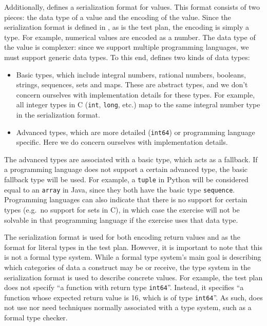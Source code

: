 \documentclass[5p,number]{elsarticle}
\begin{document}
    Additionally, \tested{} defines a serialization format for values.
    This format consists of two pieces: the data type of a value and the encoding of the value.
    Since the serialization format is defined in , as is the test plan, the encoding is simply a  type.
    For example, numerical values are encoded as a  number.
    The data type of the value is complexer: since we support multiple programming languages, we must support generic data types.
    To this end, \tested{} defines two kinds of data types:

    \begin{itemize}
        \item Basic types, which include integral numbers, rational numbers, booleans, strings, sequences, sets and maps.
        These are abstract types, and we don't concern ourselves with implementation details for these types.
        For example, all integer types in C (\texttt{int}, \texttt{long}, etc.) map to the same integral number type in the serialization format.
        \item Advanced types, which are more detailed (\texttt{int64}) or programming language specific.
        Here we do concern ourselves with implementation details.
    \end{itemize}

    The advanced types are associated with a basic type, which acts as a fallback.
    If a programming language does not support a certain advanced type, the basic fallback type will be used.
    For example, a \texttt{tuple} in Python will be considered equal to an \texttt{array} in Java, since they both have the basic type \texttt{sequence}.
    Programming languages can also indicate that there is no support for certain types (e.g.\ no support for sets in C), in which case the exercise will not be solvable in that programming language if the exercise uses that data type.
    
    The serialization format is used for both encoding return values and as the format for literal types in the test plan.
    However, it is important to note that this is not a formal type system.
    While a formal type system's main goal is describing which categories of data a construct may be or receive, the type system in the serialization format is used to describe concrete values.
    For example, the test plan does not specify ``a function with return type \texttt{int64}''.
    Instead, it specifies ``a function whose expected return value is 16, which is of type \texttt{int64}''.
    As such, \tested{} does not use nor need techniques normally associated with a type system, such as a formal type checker.
\end{document}
